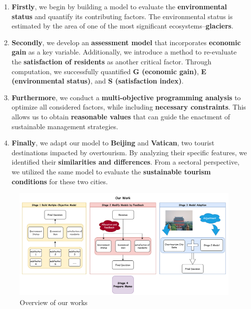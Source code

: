 \documentclass[UTF8]{mcmthesis}
\begin{document}
           \begin{enumerate}
               \item \textbf{Firstly}, we begin by building a model to evaluate the \textbf{environmental status} and quantify its contributing factors. The environmental status is estimated by the area of one of the most significant ecosystems--\textbf{glaciers}.
               
               \item \textbf{Secondly}, we develop an \textbf{assessment model} that incorporates \textbf{economic gain} as a key variable. Additionally, we introduce a method to re-evaluate the \textbf{satisfaction of residents} as another critical factor. Through computation, we successfully quantified \textbf{G (economic gain)}, \textbf{E (environmental status)}, and \textbf{S (satisfaction index)}.
               
               \item \textbf{Furthermore}, we conduct a \textbf{multi-objective programming analysis} to optimize all considered factors, while including \textbf{necessary constraints}. This allows us to obtain \textbf{reasonable values} that can guide the enactment of sustainable management strategies.
               
               \item \textbf{Finally}, we adapt our model to \textbf{Beijing} and \textbf{Vatican}, two tourist destinations impacted by overtourism. By analyzing their specific features, we identified their \textbf{similarities and differences}. From a sectoral perspective, we utilized the same model to evaluate the \textbf{sustainable tourism conditions} for these two cities.
           \end{enumerate}
           
           
            \begin{figure}[htbp]
 
                \hspace{-1cm} %
                \includegraphics[width=18cm]{overview.png}
                \caption{Overview of our works}
            \end{figure}
\end{document}
